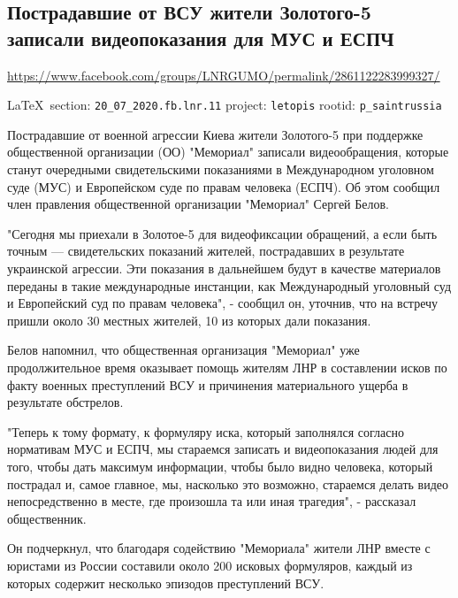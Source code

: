  
 

\subsection{Пострадавшие от ВСУ жители Золотого-5 записали видеопоказания для МУС и ЕСПЧ }
\url{https://www.facebook.com/groups/LNRGUMO/permalink/2861122283999327/}
  
\vspace{0.5cm}
{\small\LaTeX~section: \verb|20_07_2020.fb.lnr.11| project: \verb|letopis| rootid: \verb|p_saintrussia|}
\vspace{0.5cm}

Пострадавшие от военной агрессии Киева жители Золотого-5 при поддержке
общественной организации (ОО) "Мемориал" записали видеообращения, которые
станут очередными свидетельскими показаниями в Международном уголовном суде
(МУС) и Европейском суде по правам человека (ЕСПЧ). Об этом сообщил член
правления общественной организации "Мемориал" Сергей Белов. 

"Сегодня мы приехали в Золотое-5 для видеофиксации обращений, а если быть
точным --- свидетельских показаний жителей, пострадавших в результате украинской
агрессии. Эти показания в дальнейшем будут в качестве материалов переданы в
такие международные инстанции, как Международный уголовный суд и Европейский
суд по правам человека", - сообщил он, уточнив, что на встречу пришли около 30
местных жителей, 10 из которых дали показания. 

Белов напомнил, что общественная организация "Мемориал" уже продолжительное
время оказывает помощь жителям ЛНР в составлении исков по факту военных
преступлений ВСУ и причинения материального ущерба в результате обстрелов. 

"Теперь к тому формату, к формуляру иска, который заполнялся согласно
нормативам МУС и ЕСПЧ, мы стараемся записать и видеопоказания людей для того,
чтобы дать максимум информации, чтобы было видно человека, который пострадал и,
самое главное, мы, насколько это возможно, стараемся делать видео
непосредственно в месте, где произошла та или иная трагедия", - рассказал
общественник. 

Он подчеркнул, что благодаря содействию "Мемориала" жители ЛНР вместе с
юристами из России составили около 200 исковых формуляров, каждый из которых
содержит несколько эпизодов преступлений ВСУ. 

